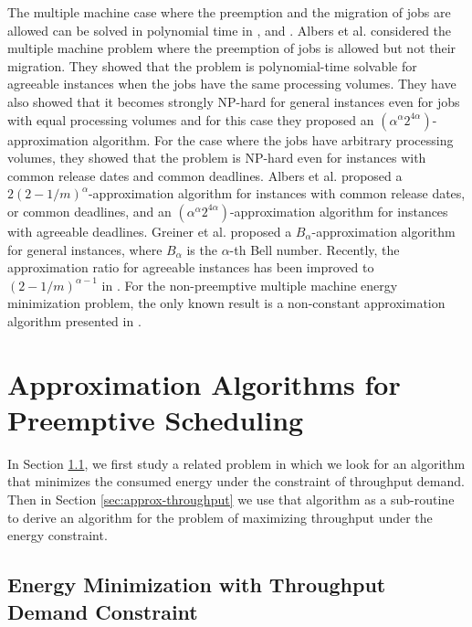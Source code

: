 \documentclass[11pt,a4paper]{article}
\begin{document}
The multiple machine case where the preemption and the migration of jobs are allowed can be solved in polynomial time in
\cite{DBLP:conf/spaa/AlbersAG11}, \cite{DBLP:conf/europar/AngelBKL12} and \cite{DBLP:conf/isaac/BampisLL12}.
Albers et al. \cite{DBLP:conf/spaa/AlbersMS07} considered the multiple machine problem
where the preemption of jobs is allowed but not their migration. They showed that the problem is polynomial-time solvable for agreeable instances when the jobs
have the same processing volumes. They have also showed that it becomes strongly
NP-hard for general instances even for jobs with equal processing volumes and for this case
they proposed an $(\alpha^{\alpha}2^{4\alpha})$-approximation algorithm. For the case
where the jobs have arbitrary processing volumes, they showed that  the problem is NP-hard
even for instances with common release dates and common deadlines. Albers et
al. proposed a $2(2-1/m)^{\alpha}$-approximation algorithm for instances with common
release dates, or common deadlines, and an
$(\alpha^{\alpha}2^{4\alpha})$-approximation algorithm for
instances with agreeable deadlines. 
Greiner et al.  \cite{DBLP:conf/spaa/GreinerNS09} proposed a $B_{\alpha}$-approximation algorithm for general instances, 
where $B_{\alpha}$ is the $\alpha$-th Bell number.
Recently, the approximation ratio for agreeable instances has been improved to
$(2-1/m)^{\alpha -1}$ in \cite{BKLLN13}. For the non-preemptive multiple machine energy minimization problem, the only known result is a non-constant approximation algorithm presented in \cite{BKLLN13}.



\section{Approximation Algorithms for Preemptive Scheduling}		\label{sec:approx}

In Section \ref{sec:approx-energy}, we first study a related problem in which we look for an algorithm
that minimizes the consumed energy under the constraint of throughput demand. 
Then in Section \ref{sec:approx-throughput} we use that algorithm as a sub-routine to derive an algorithm for 
the problem of maximizing throughput under the energy constraint. 

\subsection{Energy Minimization with Throughput Demand Constraint}	\label{sec:approx-energy}
\end{document}
